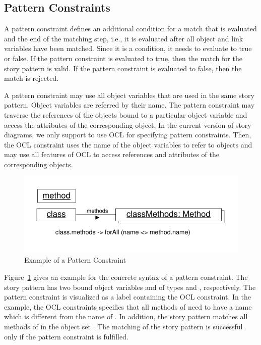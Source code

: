 {
\subsection{Pattern Constraints}
\label{sec:PatternConstraints}

A pattern constraint defines an additional condition for a match that is evaluated and the end of the matching step, i.e., it is evaluated after all object and link variables have been matched. Since it is a condition, it needs to evaluate to true or false. If the pattern constraint is evaluated to true, then the match for the story pattern is valid. If the pattern constraint is evaluated to false, then the match is rejected.

A pattern constraint may use all object variables that are used in the same story pattern. Object variables are referred by their name. The pattern constraint may traverse the references of the objects bound to a particular object variable and access the attributes of the corresponding object. In the current version of story diagrams, we only support to use OCL for specifying pattern constraints. Then, the OCL constraint uses the name of the object variables to refer to objects and may use all features of OCL to access references and attributes of the corresponding objects.

\begin{figure}[htbp]
\center
\includegraphics[width=0.6\columnwidth]{figures/PatternConstraint}
\caption{Example of a Pattern Constraint}
\label{fig:patternConstraint}
\end{figure}


Figure~\ref{fig:patternConstraint} gives an example for the concrete syntax of a pattern constraint. The story pattern has two bound object variables  and  of types  and , respectively. The pattern constraint is visualized as a label containing the OCL constraint. In the example, the OCL constraints specifies that all methods of  need to have a name which is different from the name of . In addition, the story pattern matches all methods of  in the object set . The matching of the story pattern is successful only if the pattern constraint is fulfilled.

} %


